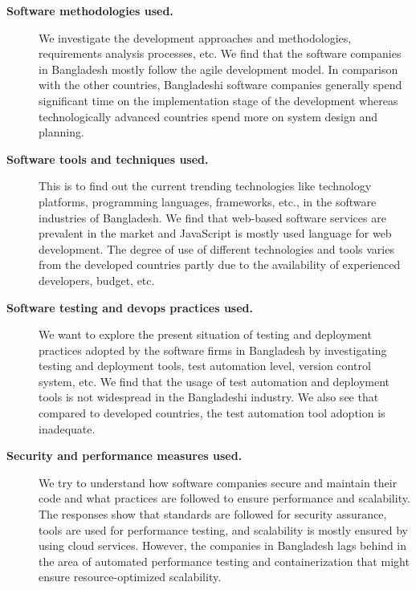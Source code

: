 \begin{description}
\item[\bf{Software methodologies used.}] We investigate the development
approaches and methodologies, requirements analysis processes, etc. We find that the software
companies in Bangladesh mostly follow the agile development model. In comparison with the
other countries, Bangladeshi software companies generally spend
significant time on the implementation stage of the development whereas
technologically advanced countries spend more on system design and planning.
\item[\bf{Software tools and techniques used}.] This is to find out the current
trending technologies like technology platforms, programming languages,
frameworks, etc., in the software industries of Bangladesh. We find that web-based software services
are prevalent in the market and JavaScript is mostly used language for web
development. The degree of use of different technologies and tools varies
from the developed countries partly due to the availability of experienced developers,
budget, etc. 
\item[\bf{Software testing and devops practices used}.] We want to explore the
present situation of testing and deployment practices adopted by the software
firms in Bangladesh by investigating testing and deployment tools, test
automation level, version control system, etc. We find
that the usage of test automation and deployment tools is not widespread in the
Bangladeshi industry. We also see that compared
to developed countries, the test automation tool adoption is inadequate. 
\item[\bf{Security and performance measures used}.] We try to understand how
software companies secure and maintain their code and what practices are
followed to ensure performance and scalability. The responses show that
standards are followed for security assurance, tools are used for performance
testing, and scalability is mostly ensured by using cloud services. However, the companies in Bangladesh lags
behind in the area of automated performance testing and containerization that
might ensure resource-optimized scalability.
\end{description}

